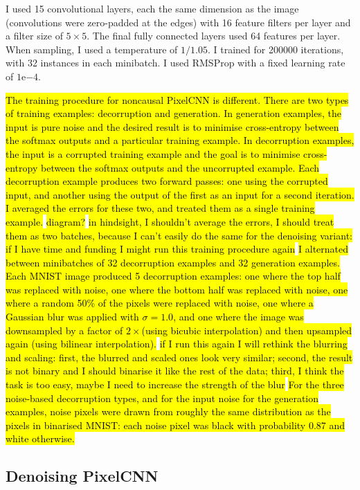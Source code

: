 \documentclass[11pt, a4paper]{book}
\begin{document}
I used 15 convolutional layers, each the same dimension as the image (convolutions were zero-padded at the edges) with 16 feature filters per layer and a filter size of $5\times 5$. The final fully connected layers used 64 features per layer. When sampling, I used a temperature of $1/1.05$. I trained for 200000 iterations, with 32 instances in each minibatch. I used RMSProp with a fixed learning rate of $1\mathrm{e}{-4}$.

\hl{The training procedure for noncausal PixelCNN is different. There are two types of training examples: decorruption and generation. In generation examples, the input is pure noise and the desired result is to minimise cross-entropy between the softmax outputs and a particular training example. In decorruption examples, the input is a corrupted training example and the goal is to minimise cross-entropy between the softmax outputs and the uncorrupted example. Each decorruption example produces two forward passes: one using the corrupted input, and another using the output of the first as an input for a second iteration. I averaged the errors for these two, and treated them as a single training example.} \hl{diagram?} \hl{in hindsight, I shouldn't average the errors, I should treat them as two batches, because I can't easily do the same for the denoising variant: if I have time and funding I might run this training procedure again} \hl{I alternated between minibatches of 32 decorruption examples and 32 generation examples. Each MNIST image produced 5 decorruption examples: one where the top half was replaced with noise, one where the bottom half was replaced with noise, one where a random 50\% of the pixels were replaced with noise, one where a Gaussian blur was applied with $\sigma=1.0$, and one where the image was downsampled by a factor of $2\times$(using bicubic interpolation) and then upsampled again (using bilinear interpolation).} \hl{if I run this again I will rethink the blurring and scaling: first, the blurred and scaled ones look very similar; second, the result is not binary and I should binarise it like the rest of the data; third, I think the task is too easy, maybe I need to increase the strength of the blur} \hl{For the three noise-based decorruption types, and for the input noise for the generation examples, noise pixels were drawn from roughly the same distribution as the pixels in binarised MNIST: each noise pixel was black with probability 0.87 and white otherwise.}

\subsection{Denoising PixelCNN}
\end{document}
